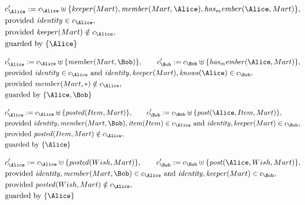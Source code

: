 \begin{align*}
&
c'_
{
\Alice
}
 := 
c_
{
\Alice
}
 \uplus 
\{
\mathit{
keeper
}
(
Mart
)
,
\mathit{
member
}
(
Mart
,
\Alice
)
,
\mathit{
has_member
}
(
\Alice
,
Mart
)
\}
,\\
&
\text{provided } 
\mathit{
identity
}
 \in c_
{
\Alice
}
,\\
&
\text{provided } 
\mathit{
keeper
}
(
Mart
)
 \notin c_
{
\Alice
}
,\\
&
\text{guarded by } \{
\Alice
\}
\end{align*}

\begin{align*}
&
c'_
{
\Alice
}
 := 
c_
{
\Alice
}
 \uplus 
\{
\mathit{
member
}
(
Mart
,
\Bob
)
\}
, \qquad 
c'_
{
\Bob
}
 := 
c_
{
\Bob
}
 \uplus 
\{
\mathit{
has_member
}
(
\Alice
,
Mart
)
\}
,\\
&
\text{provided } 
\mathit{
identity
}
 \in c_
{
\Alice
}
 \text{ and } 
\mathit{
identity
}
,
\mathit{
keeper
}
(
Mart
)
,
\mathit{
knows
}
(
\Alice
)
 \in c_
{
\Bob
}
,\\
&
\text{provided } 
\mathit{
member
}
(
Mart
,
\ast
)
 \notin c_
{
\Alice
}
,\\
&
\text{guarded by } \{
\Alice
,
\Bob
\}
\end{align*}

\begin{align*}
&
c'_
{
\Alice
}
 := 
c_
{
\Alice
}
 \uplus 
\{
\mathit{
posted
}
(
Item
,
Mart
)
\}
, \qquad 
c'_
{
\Bob
}
 := 
c_
{
\Bob
}
 \uplus 
\{
\mathit{
post
}
(
\Alice
,
Item
,
Mart
)
\}
,\\
&
\text{provided } 
\mathit{
identity
}
,
\mathit{
member
}
(
Mart
,
\Bob
)
,
\mathit{
item
}
(
Item
)
 \in c_
{
\Alice
}
 \text{ and } 
\mathit{
identity
}
,
\mathit{
keeper
}
(
Mart
)
 \in c_
{
\Bob
}
,\\
&
\text{provided } 
\mathit{
posted
}
(
Item
,
Mart
)
 \notin c_
{
\Alice
}
,\\
&
\text{guarded by } \{
\Alice
\}
\end{align*}

\begin{align*}
&
c'_
{
\Alice
}
 := 
c_
{
\Alice
}
 \uplus 
\{
\mathit{
posted
}
(
Wish
,
Mart
)
\}
, \qquad 
c'_
{
\Bob
}
 := 
c_
{
\Bob
}
 \uplus 
\{
\mathit{
post
}
(
\Alice
,
Wish
,
Mart
)
\}
,\\
&
\text{provided } 
\mathit{
identity
}
,
\mathit{
member
}
(
Mart
,
\Bob
)
 \in c_
{
\Alice
}
 \text{ and } 
\mathit{
identity
}
,
\mathit{
keeper
}
(
Mart
)
 \in c_
{
\Bob
}
,\\
&
\text{provided } 
\mathit{
posted
}
(
Wish
,
Mart
)
 \notin c_
{
\Alice
}
,\\
&
\text{guarded by } \{
\Alice
\}
\end{align*}
